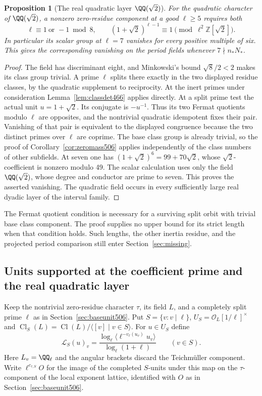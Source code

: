 \documentclass[a4paper,11pt]{article}
\newtheorem{proposition}{Proposition}[section]
\theoremstyle{definition}
\theoremstyle{remark}
\newcommand{\ZZ}{\mathbb Z}\newcommand{\ord}{\operatorname{ord}}
\numberwithin{equation}{section}
\newcommand{\Cl}{\operatorname{Cl}}
\begin{document}
\begin{proposition}[The real quadratic layer \(\QQ(\sqrt2)\)]\leavevmode
\label{prop:pellunit506}
For the quadratic character of \(\QQ(\sqrt2)\), a nonzero
zero-residue component at a good \(\ell\ge5\) requires both
\[
 \ell\equiv 1\ \text{or }-1\bmod 8,\qquad
       (1+\sqrt2)^{\ell-1}\equiv1
                           \pmod{\ell^2\ZZ[\sqrt2]} .
\]
In particular its scalar group at \(\ell=7\) vanishes for
every positive multiple of six. This gives the corresponding
vanishing on the period fields whenever \(7\nmid n_*N_*\).
\end{proposition}
\begin{proof}
The field has discriminant eight, and Minkowski's bound
\(\sqrt8/2<2\) makes its class group trivial. A prime \(\ell\)
splits there exactly in the two displayed residue classes,
by the quadratic supplement to reciprocity. At the inert
primes under consideration Lemma~\ref{lem:classdet466} applies directly. At a split
prime test the actual unit \(u=1+\sqrt2\). Its conjugate is
\(-u^{-1}\). Thus its two Fermat quotients modulo \(\ell\) are
opposites, and the nontrivial quadratic idempotent fixes their
pair. Vanishing of that pair is equivalent to the displayed
congruence because the two distinct primes over \(\ell\) are
coprime. The base class group is already trivial, so the proof of
Corollary~\ref{cor:zeromass506} applies independently of the
class numbers of other subfields. At seven one has
\((1+\sqrt2)^6=99+70\sqrt2\), whose \(\sqrt2\)-coefficient is
nonzero modulo 49. The scalar calculation uses only the field
\(\QQ(\sqrt2)\), whose degree and conductor are prime to seven.
This proves the asserted vanishing. The
quadratic field occurs in every sufficiently large real dyadic
layer of the interval family.
\end{proof}

The Fermat quotient condition is necessary for a surviving
split orbit with trivial base class component. The proof supplies
no upper bound for its strict length when that condition holds.
Such lengths, the other inertia residue, and the projected
period comparison still enter Section~\ref{sec:missing}.


\subsection{Units supported at the coefficient prime and the real quadratic layer}
\label{sec:splitunits507}

Keep the nontrivial zero-residue character \(\tau\), its field
\(L\), and a completely split prime \(\ell\) as in
Section~\ref{sec:baseunit506}. Put \(S=\{v:v\mid\ell\}\),
\(U_S=\mathcal O_L[1/\ell]^\times\) and
\(\Cl_S(L)=\Cl(L)/\langle[v]\mid v\in S\rangle\). For
\(u\in U_S\) define
\[
 \mathcal L_S(u)_v=
 \frac{\log_\ell\langle\ell^{-v_\ell(u_v)}u_v\rangle}
      {\log_\ell(1+\ell)}\qquad(v\in S).
\]
Here \(L_v=\QQ_\ell\) and the angular brackets discard the
Teichm\"uller component. Write \(\ell^{c_{\tau,S}}O\) for the
image of the completed \(S\)-units under this map on the
\(\tau\)-component of the local exponent lattice, identified
with \(O\) as in Section~\ref{sec:baseunit506}.
\end{document}
